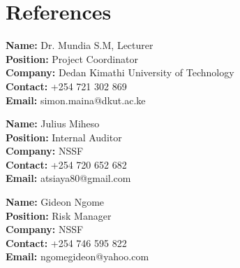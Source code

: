 \documentclass[10pt,a4paper,sans,english]{moderncv}        %
\begin{document}
\vspace{0.5cm}

\section{References}
\begin{multicols}{2} %
	\textbf{Name:} Dr. Mundia S.M, Lecturer\\
	\textbf{Position:} Project Coordinator\\
	\textbf{Company:} Dedan Kimathi University of Technology \\
	\textbf{Contact:} +254 721 302 869\\
	\textbf{Email:} simon.maina@dkut.ac.ke \\
	
	\vspace{0.5cm} %
	
	\textbf{Name:} Julius Miheso \\
	\textbf{Position:} Internal Auditor \\
	\textbf{Company:} NSSF \\
	\textbf{Contact:} +254 720 652 682 \\
	\textbf{Email:} atsiaya80@gmail.com \\
	
	\columnbreak %
	
	\phantom{Placeholder text} %
	\vspace{6\baselineskip} %
	
	\textbf{Name:} Gideon Ngome \\
	\textbf{Position:} Risk Manager \\
	\textbf{Company:} NSSF \\
	\textbf{Contact:} +254 746 595 822 \\
	\textbf{Email:} ngomegideon@yahoo.com \\
\end{multicols} %
\end{document}

